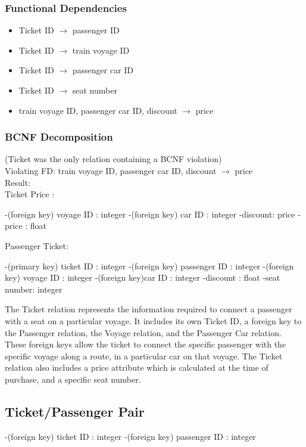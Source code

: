 \documentclass[a4paper]{article}
\begin{document}
\subsubsection*{Functional Dependencies}
\begin{itemize}
\item Ticket ID $\rightarrow$ passenger ID
\item Ticket ID $\rightarrow$ train voyage ID
\item Ticket ID $\rightarrow$ passenger car ID
\item Ticket ID $\rightarrow$ seat number
\item train voyage ID, passenger car ID, discount $\rightarrow$ price
\end{itemize}

\subsubsection*{BCNF Decomposition} 
(Ticket was the only relation containing a BCNF violation)\\
Violating FD: train voyage ID, passenger car ID, discount $\rightarrow$ price\\
Result:\\
Ticket Price :
\begin{itemize}
-(foreign key) voyage ID : integer
-(foreign key) car ID : integer
-discount: price
-price : float 
\end{itemize}
Passenger Ticket:
\begin{itemize}
-(primary key) ticket ID : integer
-(foreign key) passenger ID : integer
-(foreign key) voyage ID : integer
-(foreign key)car ID : integer
-discount : float
-seat number: integer
\end{itemize}

The Ticket relation represents the information required to connect a passenger with a seat on a particular voyage. It includes its own Ticket ID, a foreign key to the Passenger relation, the Voyage relation, and the Passenger Car relation. These foreign keys allow the ticket to connect the specific passenger with the specific voyage along a route, in a particular car on that voyage. The Ticket relation also includes a price attribute which is calculated at the time of purchase, and a specific seat number.

\subsection*{Ticket/Passenger Pair}
\begin{itemize}
-(foreign key) ticket ID : integer
-(foreign key) passenger ID : integer
\end{itemize}
	
\end{document}
